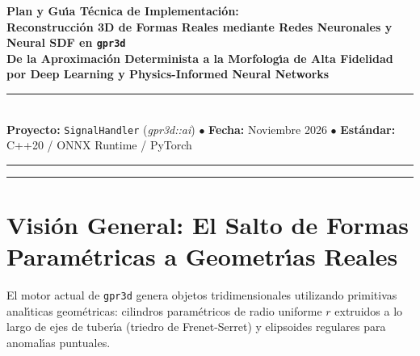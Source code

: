 \documentclass[11pt,a4paper]{article}
\begin{document}
\begin{center}
    {\LARGE \textbf{Plan y Gu{\'\i}a T{\'e}cnica de Implementaci{\'o}n:\\[0.2cm] Reconstrucci{\'o}n 3D de Formas Reales mediante Redes Neuronales y Neural SDF en \texttt{gpr3d}}}\\[0.4cm]
    {\Large \textbf{De la Aproximaci{\'o}n Determinista a la Morfolog{\'\i}a de Alta Fidelidad por Deep Learning y Physics-Informed Neural Networks}}\\[0.3cm]
    \rule{\textwidth}{1.2pt}\\[0.2cm]
    \textbf{Proyecto:} \texttt{SignalHandler} (\textit{gpr3d::ai}) \quad $\bullet$ \quad \textbf{Fecha:} Noviembre 2026 \quad $\bullet$ \quad \textbf{Est{\'a}ndar:} C++20 / ONNX Runtime / PyTorch\\
    \rule{\textwidth}{0.6pt}
\end{center}

\vspace{0.2cm}
\tableofcontents
\vspace{0.4cm}
\hrule
\vspace{0.4cm}

\section{Visi{\'o}n General: El Salto de Formas Param{\'e}tricas a Geometr{\'\i}as Reales}

El motor actual de \texttt{gpr3d} genera objetos tridimensionales utilizando primitivas anal{\'\i}ticas geom{\'e}tricas: cilindros param{\'e}tricos de radio uniforme $r$ extruidos a lo largo de ejes de tuber{\'\i}a (triedro de Frenet-Serret) y elipsoides regulares para anomal{\'\i}as puntuales.
\end{document}
